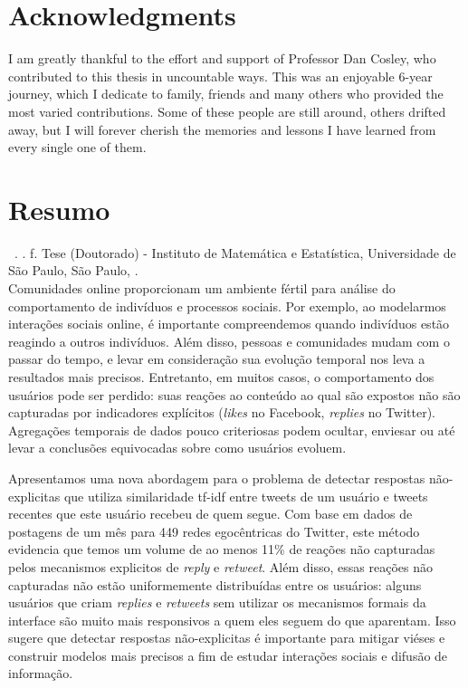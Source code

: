 \documentclass[11pt,twoside,a4paper]{book}
\begin{document}

\chapter*{Acknowledgments}

I am greatly thankful to the effort and support of Professor Dan Cosley, who contributed to this thesis in uncountable ways. This was an enjoyable 6-year journey, which I dedicate to family, friends and many others who provided the most varied contributions. Some of these people are still around, others drifted away, but I will forever cherish the memories and lessons I have learned from every single one of them.


\chapter*{Resumo}

\noindent \surnameAbbr~\textbf{\phdTitleBr}. 
\thesisYear. \thesisPages f. Tese (Doutorado) - Instituto de Matemática e Estatística,
Universidade de São Paulo, São Paulo, \thesisYear.
\\

Comunidades online proporcionam um ambiente fértil para análise do comportamento de indivíduos e processos sociais. Por exemplo, ao modelarmos interações sociais online, é importante compreendemos quando indivíduos estão reagindo a outros indivíduos. Além disso, pessoas e comunidades mudam com o passar do tempo, e levar em consideração sua evolução temporal nos leva a resultados mais precisos. Entretanto, em muitos casos, o comportamento dos usuários pode ser perdido: suas reações ao conteúdo ao qual são expostos não são capturadas por indicadores explícitos (\textsl{likes} no Facebook, \textit{replies} no Twitter). Agregações temporais de dados pouco criteriosas podem ocultar, enviesar ou até levar a conclusões equivocadas sobre como usuários evoluem. 

Apresentamos uma nova abordagem para o problema de detectar respostas não-explicitas que utiliza similaridade tf-idf entre tweets de um usuário e tweets recentes que este usuário recebeu de quem segue. Com base em dados de postagens de um mês para 449 redes egocêntricas do Twitter, este método evidencia que temos um volume de ao menos 11\% de reações não capturadas pelos mecanismos explicitos de \textit{reply} e \textit{retweet}. Além disso, essas reações não capturadas não estão uniformemente distribuídas entre os usuários: alguns usuários que criam \textit{replies} e \textit{retweets} sem utilizar os mecanismos formais da interface são muito mais responsivos a quem eles seguem do que aparentam. Isso sugere que detectar respostas não-explicitas é importante para mitigar viéses e construir modelos mais precisos a fim de estudar interações sociais e difusão de informação. 
\end{document}
